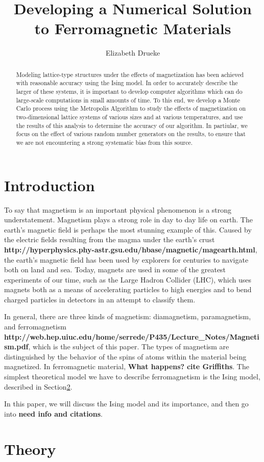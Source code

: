 \documentclass[12pt]{article}
\title{Developing a Numerical Solution to Ferromagnetic Materials}
\author{Elizabeth Drueke}
\numberwithin{equation}{section}
\begin{document}
\maketitle

\begin{abstract}
Modeling lattice-type structures under the effects of magnetization has been achieved with reasonable accuracy using the Ising model.  In order to accurately describe the larger of these systems, it is important to develop computer algorithms which can do large-scale computations in small amounts of time.  To this end, we develop a Monte Carlo process using the Metropolis Algorithm to study the effects of magnetization on two-dimensional lattice systems of various sizes and at various temperatures, and use the results of this analysis to determine the accuracy of our algorithm.  In partiular, we focus on the effect of various random number generators on the results, to ensure that we are not encountering a strong systematic bias from this source.
\end{abstract}

\section{Introduction}
\label{sec:intro}

To say that magnetism is an important physical phenomenon is a strong understatement.  Magnetism plays a strong role in day to day life on earth.  The earth's magnetic field is perhaps the most stunning example of this.  Caused by the electric fields resulting from the magma under the earth's crust \textbf{http://hyperphysics.phy-astr.gsu.edu/hbase/magnetic/magearth.html}, the earth's magnetic field has been used by explorers for centuries to navigate both on land and sea.  Today, magnets are used in some of the greatest experiments of our time, such as the Large Hadron Collider (LHC), which uses magnets both as a means of accelerating particles to high energies and to bend charged particles in detectors in an attempt to classify them.
\par In general, there are three kinds of magnetism: diamagnetism, paramagnetism, and ferromagnetism \textbf{http://web.hep.uiuc.edu/home/serrede/P435/Lecture\_Notes/Magnetism.pdf}, which is the subject of this paper.  The types of magnetism are distinguished by the behavior of the spins of atoms within the material being magnetized.  In ferromagnetic material, \textbf{What happens?} \textbf{cite Griffiths}.  The simplest theoretical model we have to describe ferromagnetism is the Ising model, described in Section\ref{sec:theory}.  
\par In this paper, we will discuss the Ising model and its importance, and then go into \textbf{need info and citations}.

\section{Theory}
\label{sec:theory}
\end{document}
